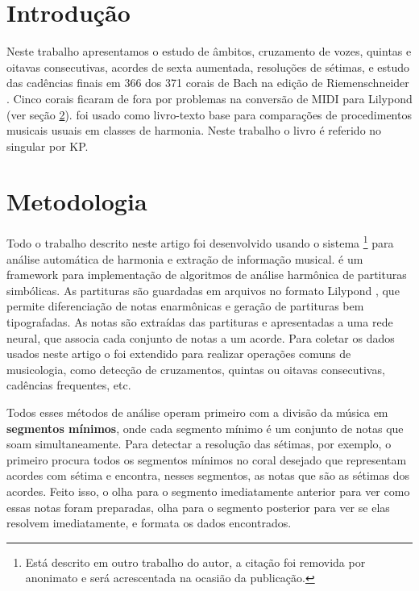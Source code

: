 \section{Introdução}
\label{sec:introducao}


Neste trabalho apresentamos o estudo de âmbitos, cruzamento de vozes,
quintas e oitavas consecutivas, acordes de sexta aumentada, resoluções
de sétimas, e estudo das cadências finais em 366 dos 371 corais de
Bach na edição de Riemenschneider \cite{bach41:371}. Cinco corais
ficaram de fora por problemas na conversão de MIDI para Lilypond (ver
seção \ref{sec:metodologia}). \cite{kostka.ea00:tonal} foi usado como
livro-texto base para comparações de procedimentos musicais usuais em
classes de harmonia. Neste trabalho o livro é referido no singular por
KP.

\section{Metodologia}
\label{sec:metodologia}

Todo o trabalho descrito neste artigo foi desenvolvido usando o
sistema \rameau{}\footnote{Está descrito em outro trabalho do autor, a
  citação foi removida por anonimato e será acrescentada na ocasião da
  publicação.} para análise automática de harmonia e extração de
informação musical. \rameau{} é um framework para implementação de
algoritmos de análise harmônica de partituras simbólicas. As
partituras são guardadas em arquivos no formato Lilypond
\cite{nienhuys.ea08:lilypond}, que permite diferenciação de notas
enarmônicas e geração de partituras bem tipografadas. As notas são
extraídas das partituras e apresentadas a uma rede neural, que associa
cada conjunto de notas a um acorde.  Para coletar os dados usados
neste artigo o \rameau{} foi extendido para realizar operações comuns
de musicologia, como detecção de cruzamentos, quintas ou oitavas
consecutivas, cadências frequentes, etc.

Todos esses métodos de análise operam primeiro com a divisão da música
em \textbf{segmentos mínimos}, onde cada segmento mínimo é um conjunto
de notas que soam simultaneamente. Para detectar a resolução das
sétimas, por exemplo, o \rameau{} primeiro procura todos os segmentos
mínimos no coral desejado que representam acordes com sétima e
encontra, nesses segmentos, as notas que são as sétimas dos
acordes. Feito isso, o \rameau{} olha para o segmento imediatamente
anterior para ver como essas notas foram preparadas, olha para o
segmento posterior para ver se elas resolvem imediatamente, e formata
os dados encontrados.

